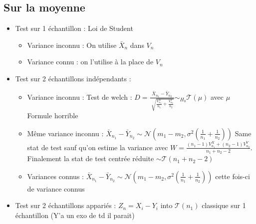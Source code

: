 \documentclass{article}
\theoremstyle{plain}%
\theoremstyle{definition}
\theoremstyle{remark}
\begin{document}
\subsection{Sur la moyenne}
\begin{itemize}
    \item Test sur 1 échantillon : Loi de Student \begin{itemize}
        \item Variance inconnu : On utilise $ \bar{X}_n $ dans $ V_n $ 
        \item Variance connu : on l'utilise à la place de $ V_n $ 
    \end{itemize}
    
    \item Test sur 2 échantillons indépendants : \begin{itemize}
        \item Variance inconnu : Test de welch : $ D = \frac{\bar{X}_{n_1} - \bar{Y}_{n_2}}{\sqrt[]{\frac{V_{n_1}^X}{n_1} + \frac{V_{n_2}^Y}{n_2}}} \sim_{H_0} \mathcal{T}(\mu ) $ avec $ \mu $ Formule horrible  
        \item Même variance inconnu : $ \bar{X}_{n_1} - \bar{Y}_{n_2} \sim \mathcal{N}(m_1 - m_2, \sigma ^2 (\frac{1}{n_1} + \frac{1}{n_2}))$ Same stat de test sauf qu'on estime la variance avec $ W = \frac{(n_1 - 1) V_{n_1}^X + (n_2 - 1) V_{n_2}^Y}{n_1 + n_2 - 2}$. Finalement la stat de test centrée réduite $ \sim \mathcal{T}(n_1 + n_2 - 2) $ 
        \item Variances connus :  $ \bar{X}_{n_1} - \bar{Y}_{n_2} \sim \mathcal{N}(m_1 - m_2, \sigma ^2 (\frac{1}{n_1} + \frac{1}{n_2}))$ cette fois-ci de variance connus
    \end{itemize}

    \item Test sur 2 échantillons appariés : $ Z_n = X_i - Y_i$ into $ \mathcal{T}(n_1) $ classique sur 1 échantillon  (Y'a un exo de td il parait)
\end{itemize}
\end{document}
